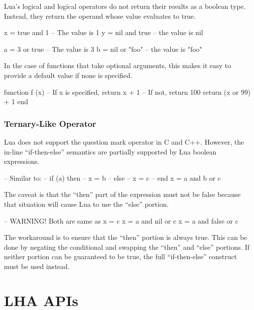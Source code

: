 Lua's logical  and logical  operators do not return
their results as a boolean type.  Instead, they return the operand whose value
evaluates to true.

\begin{LuaCode}
x = true and 1   -- The value is 1
y = nil and true -- the value is nil
\end{LuaCode}

\begin{LuaCode}
a = 3 or true    -- The value is 3
b = nil or "foo" -- the value is "foo"
\end{LuaCode}

In the case of functions that take optional arguments, this makes it easy to
provide a default value if none is specified.

\begin{LuaCode}
function f (x)
	-- If x is specified, return x + 1
	-- If not, return 100
	return (x or 99) + 1
end
\end{LuaCode}

\subsubsection{Ternary-Like Operator}

Lua does not support the question mark operator in C and C++.  However, the
in-line ``if-then-else'' semantics are partially supported by Lua boolean
expressions.

\begin{LuaCode}
-- Similar to:
--	if (a) then
--		x = b
--	else
--		x = c
--	end
x = a and b or c
\end{LuaCode}

The caveat is that the ``then'' part of the expression must not be false
because that situation will cause Lua to use the ``else'' portion.

\begin{LuaCode}
-- WARNING!  Both are same as x = c
x = a and nil or c
x = a and false or c
\end{LuaCode}

The workaround is to ensure that the ``then'' portion is always true.  This can
be done by negating the conditional and swapping the ``then'' and ``else''
portions.  If neither portion can be guaranteed to be true, the full
``if-then-else'' construct must be used instead.


\section{LHA APIs}

